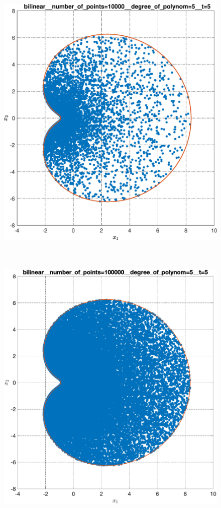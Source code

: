 \documentclass[../main.tex]{subfiles}
\begin{document}
\begin{figure}[ht!]
\begin{minipage}[b]{.3\linewidth}
 		\includegraphics[width=\linewidth]{images/bilinear__number_of_points=10000__degree_of_polynom=5__t=5.eps}
 	\end{minipage} 
 	\hfill
 	\begin{minipage}[b]{.3\linewidth} 
 		\small
 		\centering 
 		\includegraphics[width=\linewidth]{images/bilinear__number_of_points=100000__degree_of_polynom=5__t=5.eps}

\end{minipage}
\end{figure}
\end{document}
